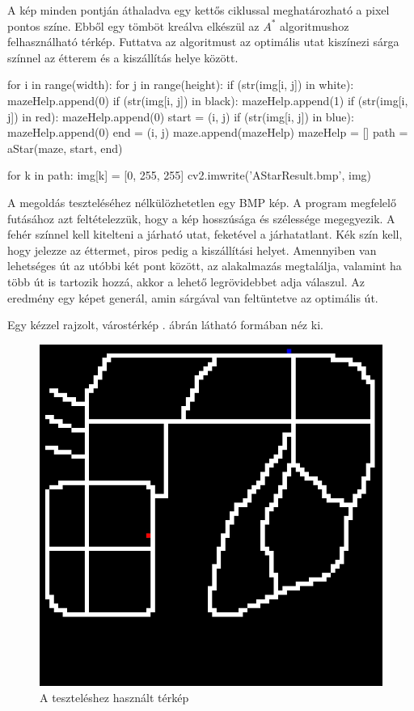 A kép minden pontján áthaladva egy kettős ciklussal meghatározható a pixel pontos színe. Ebből egy tömböt kreálva elkészül az $A^{*}$ algoritmushoz felhasználható térkép. Futtatva az algoritmust az optimális utat kiszínezi sárga színnel az étterem és a kiszállítás helye között.

\begin{python}
for i in range(width):
    for j in range(height):
        if (str(img[i, j]) in white):
            mazeHelp.append(0)
        if (str(img[i, j]) in black):
            mazeHelp.append(1)
        if (str(img[i, j]) in red):
            mazeHelp.append(0)
            start = (i, j)
        if (str(img[i, j]) in blue):
            mazeHelp.append(0)
            end = (i, j)
    maze.append(mazeHelp)
    mazeHelp = []
path = aStar(maze, start, end)

for k in path:
    img[k] = [0, 255, 255]
cv2.imwrite('AStarResult.bmp', img)
\end{python}


A megoldás teszteléséhez nélkülözhetetlen egy BMP kép. A program megfelelő futásá\-hoz azt feltételezzük, hogy a kép hosszúsága és szélessége megegyezik. A fehér színnel kell kitelteni a járható utat, feketével a járhatatlant. Kék szín kell, hogy jelezze az éttermet, piros pedig a kiszállítási helyet. Amennyiben van lehetséges út az utóbbi két pont között, az alakalmazás megtalálja, valamint ha több út is tartozik hozzá, akkor a lehető legrövidebbet adja válaszul. Az eredmény egy képet generál, amin sárgával van feltüntetve az optimális út.

Egy kézzel rajzolt, várostérkép . ábrán látható formában néz ki.

\begin{figure}[h!]
\centering
\includegraphics[scale=0.6]{images/AStarProblem.jpg}
\caption{A teszteléshez használt térkép}
\label{fig:model1problem}
\end{figure}

